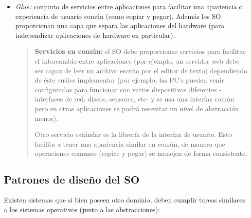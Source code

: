 \documentclass[a4paper,10pt,spanish]{article}
\begin{document}
\begin{itemize}
\begin{quote}
\end{quote}

\item \textit{Glue:} conjunto de servicios entre aplicaciones para facilitar una apariencia o experiencia de usuario común (como copiar y pegar). Además los SO proporcionan una capa que separa las aplicaciones del hardware (para independizar aplicaciones de hardware en particular).

\begin{quote}

\textbf{Servicios en común:} el SO debe proporcionar servicios para facilitar el intercambio entre aplicaciones (por ejemplo, un servidor web debe ser capaz de leer un archivo escrito por el editor de texto) dependiendo de éste cuáles implementar (por ejemplo, las PC's pueden venir configuradas para funcionar con varios dispositivos diferentes -interfaces de red, discos, sensores, etc- y se usa una interfaz común pero en otras aplicaciones se podrá necesitar un nivel de abstracción menor).

Otro servicio estándar es la librería de la interfaz de usuario. Esto facilita a tener una apariencia similar en común, de manera que operaciones comunes (copiar y pegar) se manejen de forma consistente.

\end{quote}

\end{itemize} %

\subsection{Patrones de diseño del SO}

Existen sistemas que si bien poseen otro dominio, deben cumplir tareas similares a los sistemas operativos (junto a las abstracciones):
\end{document}
